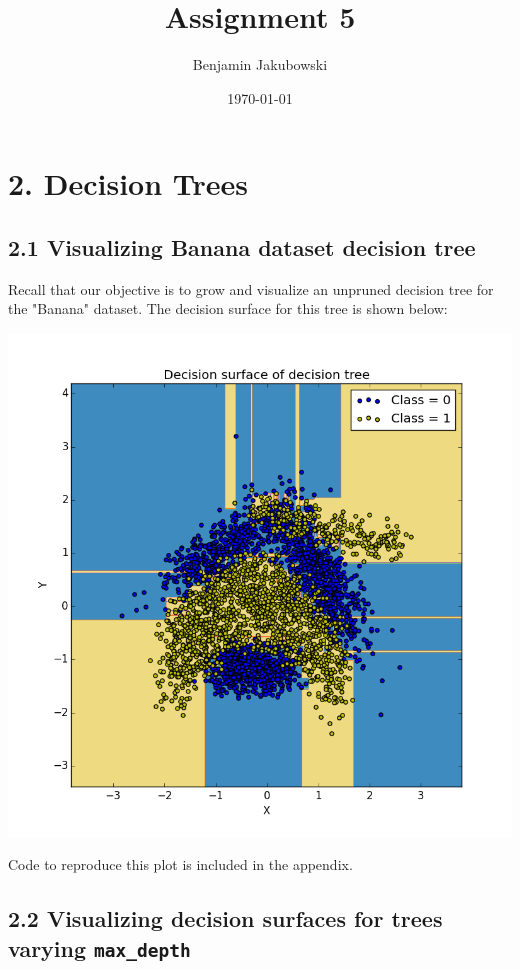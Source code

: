 \documentclass[paper=a4, fontsize=11pt]{scrartcl} %
\title{	Assignment 5}
\author{Benjamin Jakubowski} %
\date{\normalsize\today} %
\numberwithin{equation}{section} %
\numberwithin{figure}{section} %
\numberwithin{table}{section} %
\begin{document}
\maketitle %


\section*{2. Decision Trees}
\subsection*{2.1 Visualizing Banana dataset decision tree}

Recall that our objective is to grow and visualize an unpruned decision tree for the "Banana" dataset. The decision surface for this tree is shown below:
\begin{center}
\includegraphics[scale = 0.45]{./../figures/2_1_1.png}
\end{center}
Code to reproduce this plot is included in the appendix.

\subsection*{2.2 Visualizing decision surfaces for trees varying \texttt{max\_depth}}
\end{document}
